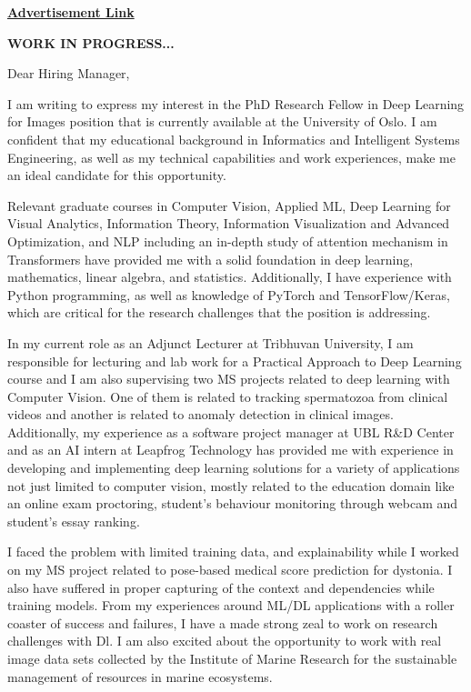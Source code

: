 \color{black}

\onehalfspacing
\setlength{\parindent}{0em}
\setlength{\parskip}{1em}

\href{https://www.jobbnorge.no/en/available-jobs/job/237204/phd-research-fellow-in-deep-learning-for-images}{\textbf{Advertisement Link}}

\textbf{WORK IN PROGRESS...}


Dear Hiring Manager,

I am writing to express my interest in the PhD Research Fellow in Deep Learning for Images position that is currently available at the University of Oslo. I am confident that my educational background in Informatics and Intelligent Systems Engineering, as well as my technical capabilities and work experiences, make me an ideal candidate for this opportunity.

Relevant graduate courses in Computer Vision, Applied ML, Deep Learning for Visual Analytics, Information Theory, Information Visualization and Advanced Optimization, and NLP including an in-depth study of attention mechanism in Transformers  have provided me with a solid foundation in deep learning, mathematics, linear algebra, and statistics. Additionally, I have experience with Python programming, as well as knowledge of PyTorch and TensorFlow/Keras, which are critical for the research challenges that the position is addressing.

In my current role as an Adjunct Lecturer at Tribhuvan University, I am responsible for lecturing and lab work for a Practical Approach to Deep Learning course and I am also supervising two MS projects related to deep learning with Computer Vision. One of them is related to tracking spermatozoa from clinical videos and another is related to anomaly detection in clinical images.
Additionally, my experience as a software project manager at UBL R\&D Center and as an AI intern at Leapfrog Technology has provided me with experience in developing and implementing deep learning solutions for a variety of applications not just limited to computer vision, mostly related to the education domain like an online exam proctoring, student's behaviour monitoring through webcam and student's essay ranking.

I faced the problem with limited training data, and explainability while I worked on my MS project related to pose-based medical score prediction for dystonia. I also have suffered in  proper capturing of the  context and dependencies while training models. From my experiences around ML/DL applications with a roller coaster of success and failures, I have a made strong zeal to work on research challenges with Dl. I am also excited about the opportunity to work with real image data sets collected by the Institute of Marine Research for the sustainable management of resources in marine ecosystems.

